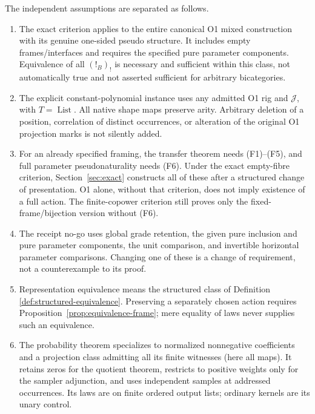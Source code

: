 \documentclass[11pt,a4paper]{article}
\theoremstyle{definition}
\newcommand{\J}{\mathcal J}
\newcommand{\List}{\operatorname{List}}
\begin{document}
The independent assumptions are separated as follows.
\begin{enumerate}
\item The exact criterion applies to the entire canonical O1 mixed
construction with its genuine one-sided pseudo structure. It includes empty
frames/interfaces and requires the specified pure parameter components.
Equivalence of all $(!_B)_!$ is necessary and sufficient within this class,
not automatically true and not asserted sufficient for arbitrary
bicategories.
\item The explicit constant-polynomial instance uses any admitted O1 rig and
$\J$, with $T=\List$. All native shape maps preserve arity.
Arbitrary deletion of a position,
correlation of distinct occurrences, or alteration of the original O1
projection marks is not silently added.
\item For an already specified framing, the transfer theorem needs
(F1)--(F5), and full parameter pseudonaturality needs (F6). Under the exact
empty-fibre criterion, Section~\ref{sec:exact} constructs all of these
after a structured change of presentation. O1 alone, without that criterion,
does not imply existence of a full action. The finite-copower criterion
still proves only the fixed-frame/bijection version without (F6).
\item The receipt no-go uses global grade retention, the given pure
inclusion and pure parameter components, the unit comparison, and
invertible horizontal parameter comparisons. Changing one of these is a
change of requirement, not a counterexample to its proof.
\item Representation equivalence means the structured class of Definition
\ref{def:structured-equivalence}. Preserving a separately chosen action
requires Proposition~\ref{prop:equivalence-frame}; mere equality of laws
never supplies such an equivalence.
\item The probability theorem specializes to normalized nonnegative
coefficients and a projection class admitting all its finite witnesses
(here all maps). It retains zeros for the quotient theorem, restricts to
positive weights only for the sampler adjunction, and uses independent
samples at addressed occurrences. Its laws are on finite ordered output
lists; ordinary kernels are its unary control.
\end{enumerate}
\end{document}
